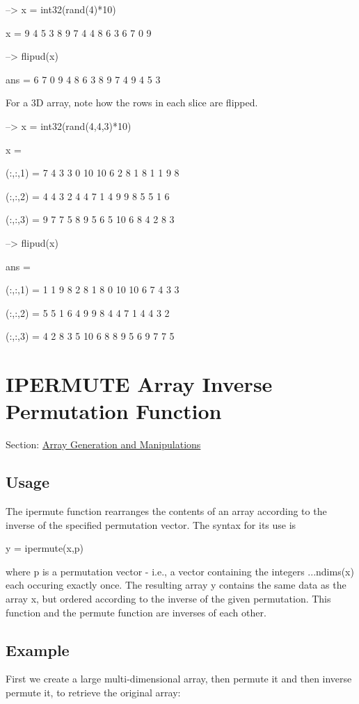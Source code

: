 \begin{DoxyVerbInclude}
--> x = int32(rand(4)*10)

x = 
 9 4 5 3 
 8 9 7 4 
 4 8 6 3 
 6 7 0 9 

--> flipud(x)

ans = 
 6 7 0 9 
 4 8 6 3 
 8 9 7 4 
 9 4 5 3 
\end{DoxyVerbInclude}


For a 3\-D array, note how the rows in each slice are flipped.


\begin{DoxyVerbInclude}
--> x = int32(rand(4,4,3)*10)

x = 

(:,:,1) = 
  7  4  3  3 
  0 10 10  6 
  2  8  1  8 
  1  1  9  8 

(:,:,2) = 
  4  4  3  2 
  4  4  7  1 
  4  9  9  8 
  5  5  1  6 

(:,:,3) = 
  9  7  7  5 
  8  9  5  6 
  5 10  6  8 
  4  2  8  3 

--> flipud(x)

ans = 

(:,:,1) = 
  1  1  9  8 
  2  8  1  8 
  0 10 10  6 
  7  4  3  3 

(:,:,2) = 
  5  5  1  6 
  4  9  9  8 
  4  4  7  1 
  4  4  3  2 

(:,:,3) = 
  4  2  8  3 
  5 10  6  8 
  8  9  5  6 
  9  7  7  5 
\end{DoxyVerbInclude}
 \hypertarget{array_ipermute}{}\section{I\-P\-E\-R\-M\-U\-T\-E Array Inverse Permutation Function}\label{array_ipermute}
Section\-: \hyperlink{sec_array}{Array Generation and Manipulations} \hypertarget{vtkwidgets_vtkxyplotwidget_Usage}{}\subsection{Usage}\label{vtkwidgets_vtkxyplotwidget_Usage}
The {\ttfamily ipermute} function rearranges the contents of an array according to the inverse of the specified permutation vector. The syntax for its use is \begin{DoxyVerb}   y = ipermute(x,p)
\end{DoxyVerb}
 where {\ttfamily p} is a permutation vector -\/ i.\-e., a vector containing the integers {...ndims(x)} each occuring exactly once. The resulting array {\ttfamily y} contains the same data as the array {\ttfamily x}, but ordered according to the inverse of the given permutation. This function and the {\ttfamily permute} function are inverses of each other. \hypertarget{variables_struct_Example}{}\subsection{Example}\label{variables_struct_Example}
First we create a large multi-\/dimensional array, then permute it and then inverse permute it, to retrieve the original array\-:


